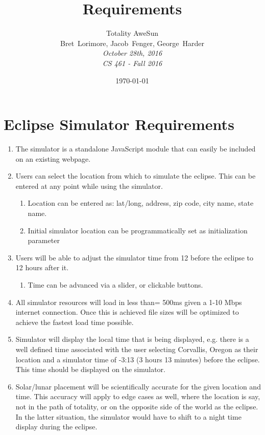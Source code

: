 \documentclass[10pt, onecolumn, draftclsnofoot, letterpaper]{IEEEtran}
\title{Requirements}
\date{\today} %
\author{Totality AweSun \\
		Bret~Lorimore, Jacob~Fenger, George~Harder \\
		\textit{October 28th, 2016 \\
		CS 461 - Fall 2016}}
\begin{document}
\maketitle

\section{Eclipse Simulator Requirements}

\begin{enumerate}
	\item The simulator is a standalone JavaScript module that can 
	easily be included on an existing webpage.

	\item Users can select the location from which to simulate the 
	eclipse. This can be entered at any point while using the 
	simulator.
	\begin{enumerate}
		\item Location can be entered as: lat/long, address, zip
		code, city name, state name.
		\item Initial simulator location can be programmatically 
		set as initialization parameter
	\end{enumerate}

	\item Users will be able to adjust the simulator time from 12 
	before the eclipse to 12 hours after it.
	\begin{enumerate}
		\item Time can be advanced via a slider, or clickable 
		buttons.
	\end{enumerate}

	\item All simulator resources will load in less than= 500ms given a 
	1-10 Mbps internet connection. Once this is achieved file sizes
	will be optimized to achieve the fastest load time possible.

	\item Simulator will display the local time that is being 
	displayed, e.g. there is a well defined time associated with 
	the user selecting Corvallis, Oregon as their location and a 
	simulator time of -3:13 (3 hours 13 minutes) before the 
	eclipse. This time should be displayed on the simulator.

	\item Solar/lunar placement will be scientifically accurate for
	the given location and time. This accuracy will apply to edge 
	cases as well, where the location is say, not in the path of 
	totality, or on the opposite side of the world as the eclipse.
	In the latter situation, the simulator would have to shift to
	a night time display during the eclipse.
\end{enumerate}
\end{document}
